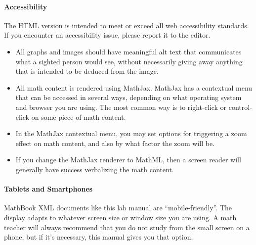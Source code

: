 \documentclass[12pt,]{book}
\theoremstyle{plain}
\theoremstyle{definition}
\theoremstyle{definition}
\theoremstyle{definition}
\theoremstyle{definition}
\theoremstyle{definition}
\numberwithin{equation}{section}
\begin{document}
\paragraph[{Accessibility}]{Accessibility}\hypertarget{paragraphs-3}{}
The HTML version is intended to meet or exceed all web accessibility standards. If you encounter an accessibility issue, please report it to the editor.%
\leavevmode%
\begin{itemize}[label=\textbullet]
\item{}All graphs and images should have meaningful alt text that communicates what a sighted person would see, without necessarily giving away anything that is intended to be deduced from the image.%
\item{}All math content is rendered using MathJax. MathJax has a contextual menu that can be accessed in several ways, depending on what operating system and browser you are using. The most common way is to right-click or control-click on some piece of math content.%
\item{}In the MathJax contextual menu, you may set options for triggering a zoom effect on math content, and also by what factor the zoom will be.%
\item{}If you change the MathJax renderer to MathML, then a screen reader will generally have success verbalizing the math content.%
\end{itemize}
\typeout{************************************************}
\typeout{************************************************}
\paragraph[{Tablets and Smartphones}]{Tablets and Smartphones}\hypertarget{paragraphs-4}{}
MathBook XML documents like this lab manual are ``mobile-friendly''. The display adapts to whatever screen size or window size you are using. A math teacher will always recommend that you do not study from the small screen on a phone, but if it's necessary, this manual gives you that option.%
\end{document}
